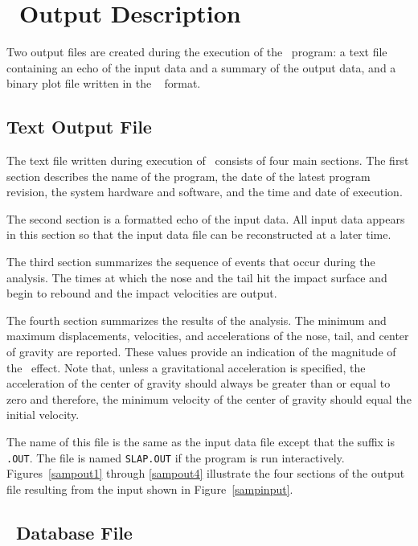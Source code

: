 \section{\SLAP\  Output Description}

Two output files are created during the execution of the \SLAP\ program:
a text file containing an echo of the input data and a summary of the
output data, and a binary plot file written in the \EXO~\cite{EXODUS}
format. 

\subsection{Text Output File}

The text file written during execution of \SLAP\  consists
of four main sections.  The first section describes the name of the
program, the date of the latest program revision, the system hardware
and software, and the time and date of execution. 

The second section is a formatted echo of the input data. All input data
appears in this section so that the input data file can be reconstructed
at a later time. 

The third section summarizes the sequence of events that occur during
the analysis.  The times at which the nose and the tail hit the impact
surface and begin to rebound and the impact velocities are output.

The fourth section summarizes the results of the analysis.  The minimum
and maximum displacements, velocities, and accelerations of the nose,
tail, and center of gravity are reported.  These values provide an
indication of the magnitude of the \SLAP\  effect.  Note that, unless
a gravitational acceleration is specified, the acceleration of the
center of gravity should always be greater than or equal to zero and
therefore, the minimum velocity of the center of gravity should equal
the initial velocity. 

The name of this file is the same as the input data file except that the
suffix is {\tt .OUT}.  The file is named {\tt SLAP.OUT} if the program
is run interactively.  Figures~\ref{sampout1} through \ref{sampout4}
illustrate the four sections of the output file resulting from the input
shown in Figure~\ref{sampinput}. 

\subsection{\EXO\ Database File}

